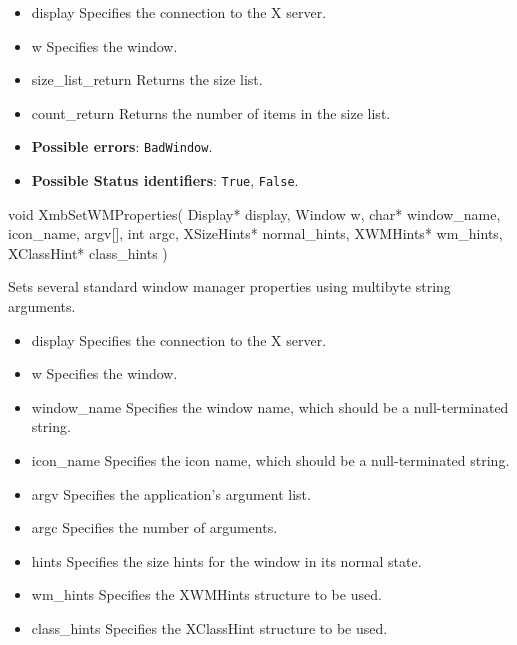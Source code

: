 \documentclass{report}
\begin{document}
\begin{itemize}
            \begin{itemize}
                \item display Specifies the connection to the X server.
                \item w Specifies the window.
                \item size\_list\_return Returns the size list.
                \item count\_return Returns the number of items in the size list.
            \end{itemize}

            \begin{itemize}
                \item \textbf{Possible errors}: \texttt{BadWindow}.
                \item \textbf{Possible Status identifiers}: \texttt{True}, \texttt{False}.
            \end{itemize}

            \begin{cppcode}
            void XmbSetWMProperties(
                Display* display,
                Window w,
                char* window_name, icon_name, argv[],
                int argc,
                XSizeHints* normal_hints,
                XWMHints* wm_hints,
                XClassHint* class_hints
            )
            \end{cppcode}
            \bigbreak \noindent
            Sets several standard window manager properties using multibyte string arguments.

            \begin{itemize}
                \item display Specifies the connection to the X server.
                \item w Specifies the window.
                \item window\_name Specifies the window name, which should be a null-terminated string.
                \item icon\_name Specifies the icon name, which should be a null-terminated string.
                \item argv Specifies the application’s argument list.
                \item argc Specifies the number of arguments.
                \item hints Specifies the size hints for the window in its normal state.
                \item wm\_hints Specifies the XWMHints structure to be used.
                \item class\_hints Specifies the XClassHint structure to be used.
            \end{itemize}


\end{itemize}
\end{document}
